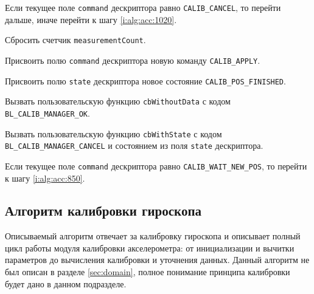 \begin{enumerate_step}
    \item \label{i:alg:acc:1010} Если текущее поле \lstinline|command| дескриптора равно \lstinline|CALIB_CANCEL|, то перейти дальше, иначе перейти к шагу
    \ref{i:alg:acc:1020}.
    \item Сбросить счетчик \lstinline|measurementCount|.
    \item Присвоить полю \lstinline|command| дескриптора  новую команду \lstinline|CALIB_APPLY|.
    \item Присвоить полю \lstinline|state| дескриптора новое состояние \lstinline|CALIB_POS_FINISHED|.
    \item Вызвать пользовательскую функцию \lstinline|cbWithoutData| с кодом \lstinline|BL_CALIB_MANAGER_OK|.
    \item Вызвать пользовательскую функцию \lstinline|cbWithState| с кодом \lstinline|BL_CALIB_MANAGER_CANCEL| и состоянием из поля \lstinline|state| дескриптора.
    \item \label{i:alg:acc:1020} Если текущее поле \lstinline|command| дескриптора равно \lstinline|CALIB_WAIT_NEW_POS|, то перейти к шагу
    \ref{i:alg:acc:850}.
\end{enumerate_step}

\subsection{Алгоритм калибровки гироскопа}

Описываемый алгоритм отвечает за калибровку гироскопа и описывает полный цикл работы модуля калибровки акселерометра: от инициализации и вычитки параметров до
вычисления калибровки и уточнения данных. Данный алгоритм не был описан в разделе \ref{sec:domain}, полное понимание принципа калибровки будет дано в данном подразделе.

